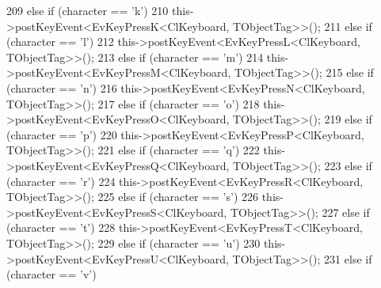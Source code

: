 \begin{DoxyCode}
{209                         \textcolor{keywordflow}{else} \textcolor{keywordflow}{if} (character == \textcolor{charliteral}{'k'})
210                                 this->postKeyEvent<EvKeyPressK<ClKeyboard, TObjectTag>>();
211                         \textcolor{keywordflow}{else} \textcolor{keywordflow}{if} (character == \textcolor{charliteral}{'l'})
212                                 this->postKeyEvent<EvKeyPressL<ClKeyboard, TObjectTag>>();
213                         \textcolor{keywordflow}{else} \textcolor{keywordflow}{if} (character == \textcolor{charliteral}{'m'})
214                                 this->postKeyEvent<EvKeyPressM<ClKeyboard, TObjectTag>>();
215                         \textcolor{keywordflow}{else} \textcolor{keywordflow}{if} (character == \textcolor{charliteral}{'n'})
216                                 this->postKeyEvent<EvKeyPressN<ClKeyboard, TObjectTag>>();
217                         \textcolor{keywordflow}{else} \textcolor{keywordflow}{if} (character == \textcolor{charliteral}{'o'})
218                                 this->postKeyEvent<EvKeyPressO<ClKeyboard, TObjectTag>>();
219                         \textcolor{keywordflow}{else} \textcolor{keywordflow}{if} (character == \textcolor{charliteral}{'p'})
220                                 this->postKeyEvent<EvKeyPressP<ClKeyboard, TObjectTag>>();
221                         \textcolor{keywordflow}{else} \textcolor{keywordflow}{if} (character == \textcolor{charliteral}{'q'})
222                                 this->postKeyEvent<EvKeyPressQ<ClKeyboard, TObjectTag>>();
223                         \textcolor{keywordflow}{else} \textcolor{keywordflow}{if} (character == \textcolor{charliteral}{'r'})
224                                 this->postKeyEvent<EvKeyPressR<ClKeyboard, TObjectTag>>();
225                         \textcolor{keywordflow}{else} \textcolor{keywordflow}{if} (character == \textcolor{charliteral}{'s'})
226                                 this->postKeyEvent<EvKeyPressS<ClKeyboard, TObjectTag>>();
227                         \textcolor{keywordflow}{else} \textcolor{keywordflow}{if} (character == \textcolor{charliteral}{'t'})
228                                 this->postKeyEvent<EvKeyPressT<ClKeyboard, TObjectTag>>();
229                         \textcolor{keywordflow}{else} \textcolor{keywordflow}{if} (character == \textcolor{charliteral}{'u'})
230                                 this->postKeyEvent<EvKeyPressU<ClKeyboard, TObjectTag>>();
231                         \textcolor{keywordflow}{else} \textcolor{keywordflow}{if} (character == \textcolor{charliteral}{'v'})
}
\end{DoxyCode}
